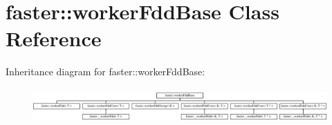 \hypertarget{classfaster_1_1workerFddBase}{}\section{faster\+:\+:worker\+Fdd\+Base Class Reference}
\label{classfaster_1_1workerFddBase}
Inheritance diagram for faster\+:\+:worker\+Fdd\+Base\+:\begin{figure}[H]
\begin{center}
\leavevmode
\includegraphics[height=1.333333cm]{classfaster_1_1workerFddBase}
\end{center}
\end{figure}
